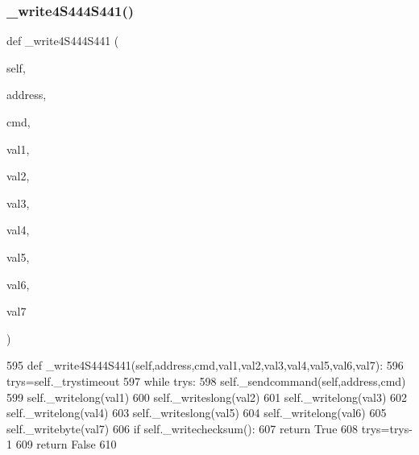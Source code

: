 \subsubsection{\texorpdfstring{\+\_\+write4\+S444\+S441()}{\_write4S444S441()}}
{\footnotesize\ttfamily def \+\_\+write4\+S444\+S441 (\begin{DoxyParamCaption}\item[{}]{self,  }\item[{}]{address,  }\item[{}]{cmd,  }\item[{}]{val1,  }\item[{}]{val2,  }\item[{}]{val3,  }\item[{}]{val4,  }\item[{}]{val5,  }\item[{}]{val6,  }\item[{}]{val7 }\end{DoxyParamCaption})\hspace{0.3cm}{\ttfamily [private]}}


\begin{DoxyCode}
595     \textcolor{keyword}{def }\_write4S444S441(self,address,cmd,val1,val2,val3,val4,val5,val6,val7):
596         trys=self.\_trystimeout
597         \textcolor{keywordflow}{while} trys:
598             self.\_sendcommand(self,address,cmd)
599             self.\_writelong(val1)
600             self.\_writeslong(val2)
601             self.\_writelong(val3)
602             self.\_writelong(val4)
603             self.\_writeslong(val5)
604             self.\_writelong(val6)
605             self.\_writebyte(val7)
606             \textcolor{keywordflow}{if} self.\_writechecksum():
607                 \textcolor{keywordflow}{return} \textcolor{keyword}{True}
608             trys=trys-1
609         \textcolor{keywordflow}{return} \textcolor{keyword}{False}
610 
\end{DoxyCode}
\mbox{\label{classtoxic__hardware_1_1roboclaw__3_1_1Roboclaw_afc692daccdef6d41332b2c9f4063cad5}} 
